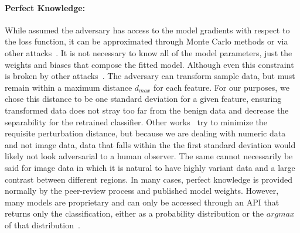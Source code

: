 \documentclass[fonts]{icst}
\begin{document}
\paragraph{Perfect Knowledge: }
While assumed the adversary has access to the model gradients with respect to the loss function, it can be approximated through Monte Carlo methods or via other attacks~\cite{wang2019security,chakraborty2018adversarial}.
It is not necessary to know all of the model parameters, just the weights and biases that compose the fitted model.
Although even this constraint is broken by other attacks~\cite{wang2019security,chakraborty2018adversarial}.
The adversary can transform sample data, but must remain within a maximum distance $d_{max}$ for each feature.
For our purposes, we chose this distance to be one standard deviation for a given feature, ensuring transformed data does not stray too far from the benign data and decrease the separability for the retrained classifier.
Other works~\cite{biggio2012poisoning,stutz2019confidence,li2016general} try to minimize the requisite perturbation distance, but because we are dealing with numeric data and not image data, data that falls within the the first standard deviation would likely not look adversarial to a human observer.
The same cannot necessarily be said for image data in which it is natural to have highly variant data and a large contrast between different regions.
In many cases, perfect knowledge is provided normally by the peer-review process and published model weights.
However, many models are proprietary and can only be accessed through an API that returns only the classification, either as a probability distribution or the $argmax$ of that distribution~\cite{tramer2016stealing}.
\end{document}
